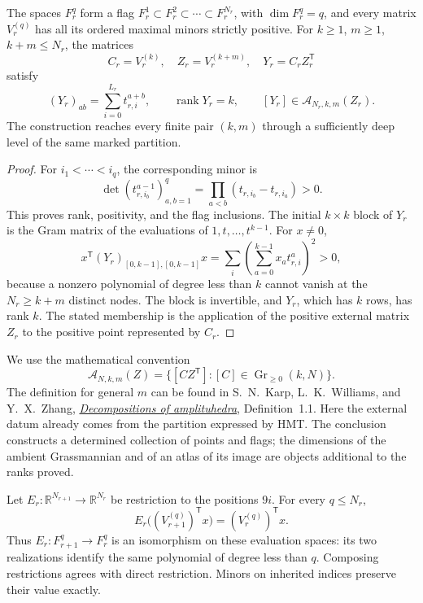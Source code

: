 \begin{theorem}
\label{thm:dim-all-ranks}
The spaces \(F_r^q\) form a flag
\(F_r^1\subset F_r^2\subset\cdots\subset F_r^{N_r}\), with
\(\dim F_r^q=q\), and every matrix \(V_r^{(q)}\) has all its
ordered maximal minors strictly positive. For
\(k\geq1\), \(m\geq1\), \(k+m\leq N_r\), the matrices
\[
 C_r=V_r^{(k)},\quad Z_r=V_r^{(k+m)},\quad
 Y_r=C_rZ_r^{\mathsf T}
\]
satisfy
\[
 (Y_r)_{ab}=\sum_{i=0}^{L_r}t_{r,i}^{a+b},\qquad
 \operatorname{rank}Y_r=k,\qquad
 [Y_r]\in\mathcal A_{N_r,k,m}(Z_r).
\]
The construction reaches every finite pair \((k,m)\) through a
sufficiently deep level of the same marked partition.
\end{theorem}
\begin{proof}
For \(i_1<\cdots<i_q\), the corresponding minor is
\[
 \det(t_{r,i_b}^{a-1})_{a,b=1}^{q}
   =\prod_{a<b}(t_{r,i_b}-t_{r,i_a})>0.
\]
This proves rank, positivity, and the flag inclusions. The initial
\(k\times k\) block of \(Y_r\) is the Gram matrix of the evaluations
of \(1,t,\ldots,t^{k-1}\). For \(x\neq0\),
\[
 x^{\mathsf T}(Y_r)_{[0,k-1],[0,k-1]}x
 =\sum_i\left(\sum_{a=0}^{k-1}x_at_{r,i}^{a}\right)^2>0,
\]
because a nonzero polynomial of degree less than \(k\) cannot vanish
at the \(N_r\geq k+m\) distinct nodes. The block is invertible,
and \(Y_r\), which has \(k\) rows, has rank \(k\).
The stated membership is the application of the positive external
matrix \(Z_r\) to the positive point represented by \(C_r\).
\end{proof}

We use the mathematical convention
\[
 \mathcal A_{N,k,m}(Z)=
 \{[CZ^{\mathsf T}]:[C]\in\operatorname{Gr}_{\geq0}(k,N)\}.
\]
The definition for general \(m\) can be found in S.~N.~Karp,
L.~K.~Williams, and Y.~X.~Zhang,
\href{https://people.math.harvard.edu/~williams/papers/amplituhedron-plus.pdf}
{\emph{Decompositions of amplituhedra}}, Definition~1.1.
Here the external datum already comes from the partition expressed by HMT.
The conclusion constructs a determined collection of points and flags;
the dimensions of the ambient Grassmannian and of an atlas of its
image are objects additional to the ranks proved.

Let \(E_r:\mathbb R^{N_{r+1}}\to\mathbb R^{N_r}\) be restriction
to the positions \(9i\). For every \(q\leq N_r\),
\[
 E_r\bigl((V_{r+1}^{(q)})^{\mathsf T}x\bigr)
       =(V_r^{(q)})^{\mathsf T}x.
\]
Thus \(E_r:F_{r+1}^q\to F_r^q\) is an isomorphism on these
evaluation spaces: its two realizations identify the same polynomial
of degree less than \(q\). Composing restrictions agrees with direct
restriction. Minors on inherited indices preserve their value exactly.

